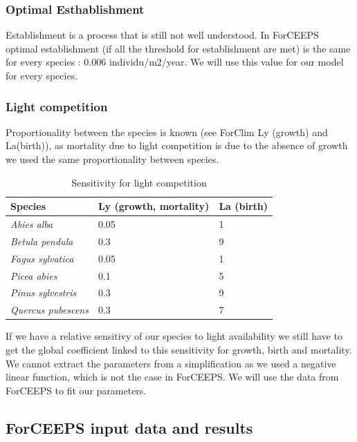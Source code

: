 \documentclass{article}
\begin{document}
\subsubsection{Optimal Esthablishment}

Establishment is a process that is still not well understood. In ForCEEPS optimal establishment (if all the threshold for establishment are met) is the same for every species : 0.006 individu/m2/year. We will use this value for our model for every species.

\subsubsection {Light competition}

Proportionality between the species is known (see ForClim Ly (growth) and La(birth)), as mortality due to light competition is due to the absence of growth we used the same proportionality between species.

\begin{table}[H]
\begin{center}
    \begin{tabular}{lll}
    \hline
    Species & Ly (growth, mortality) & La (birth) \\ \hline
    \textit{Abies alba} & 0.05 & 1 \\
    \textit{Betula pendula} & 0.3 & 9 \\
    \textit{Fagus sylvatica} & 0.05 & 1 \\
    \textit{Picea abies} & 0.1 & 5 \\
    \textit{Pinus sylvestris} & 0.3 & 9 \\
    \textit{Quercus pubescens} & 0.3 & 7 \\ \hline
    \end{tabular}
    \caption{Sensitivity for light competition}
    \label{tab:prop_sensitivity}
\end{center}
\end{table}

If we have a relative sensitivy of our species to light availability we still have to get the global coefficient linked to this sensitivity for growth, birth and mortality. We cannot extract the parameters from a simplification as we used a negative linear function, which is not the case in ForCEEPS. We will use the data from ForCEEPS to fit our parameters.

\subsection{ForCEEPS input data and results}
\end{document}
